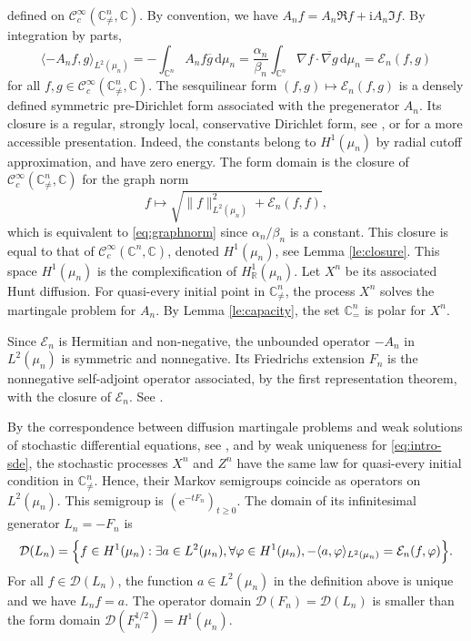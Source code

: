 \documentclass[11pt,reqno]{amsart}
\numberwithin{equation}{section}%
\numberwithin{figure}{section}%
\numberwithin{table}{section}
\theoremstyle{plain}
\theoremstyle{definition}
\begin{document}
defined on $\mathcal{C}^\infty_c(\mathbb{C}^n_{\neq},\mathbb{C})$. By
convention, we have $A_nf=A_n\Re f+\mathrm{i}A_n\Im f$. By integration by
parts,
\begin{equation}
  \langle -A_nf,g\rangle_{L^2(\mu_n)}
  =-\int_{\mathbb{C}^n}A_nf\overline{g}\,\mathrm{d}\mu_n
  =\frac{\alpha_n}{\beta_n}\int_{\mathbb{C}^n}\nabla f\cdot\overline{\nabla g}\,\mathrm{d}\mu_n
  =\mathcal{E}_n(f,g)
\end{equation}
for all $f,g\in\mathcal{C}^\infty_c(\mathbb{C}^n_{\neq},\mathbb{C})$. The
sesquilinear form $(f,g)\mapsto\mathcal{E}_n(f,g)$ is a densely defined
symmetric pre-Dirichlet form associated with the pregenerator $A_n$. Its
closure is a regular, strongly local, conservative Dirichlet form, see
\cite[Ch.~2, 4, 5, and 7]{FukushimaOshimaTakeda}, or \cite{Ouhabaz} for a more
accessible presentation. Indeed, the constants belong to $H^1(\mu_n)$ by
radial cutoff approximation, and have zero energy. The form domain is the
closure of $\mathcal{C}^\infty_c(\mathbb{C}^n_{\neq},\mathbb{C})$ for the
graph norm
\begin{equation}\label{eq:graph:norm:En}
  f\mapsto\sqrt{\|f\|_{L^2(\mu_n)}^2+\mathcal{E}_n(f,f)},
\end{equation}
which is equivalent to \eqref{eq:graphnorm} since $\alpha_n/\beta_n$ is a
constant. This closure is equal to that of
$\mathcal{C}^\infty_c(\mathbb{C}^n,\mathbb{C})$, denoted $H^1(\mu_n)$, see
Lemma \ref{le:closure}. This space $H^1(\mu_n)$ is the complexification of
$H^1_{\mathbb{R}}(\mu_n)$. Let $X^n$ be its associated Hunt diffusion. For
quasi-every initial point in $\mathbb{C}^n_{\neq}$, the process $X^n$ solves
the martingale problem for $A_n$. By Lemma \ref{le:capacity}, the set
$\mathbb{C}^n_{=}$ is polar for $X^n$.

Since $\mathcal{E}_n$ is Hermitian and non-negative, the unbounded operator
$-A_n$ in $L^2(\mu_n)$ is symmetric and nonnegative. Its Friedrichs extension
$F_n$ is the nonnegative self-adjoint operator associated, by the first
representation theorem, with the closure of $\mathcal{E}_n$. See
\cite[Ch.~VI]{Kato}.

By the correspondence between diffusion martingale problems and weak solutions
of stochastic differential equations, see \cite[Chs.~4--5]{EthierKurtz}, and
by weak uniqueness for \eqref{eq:intro-sde}, the stochastic processes $X^n$
and $Z^n$ have the same law for quasi-every initial condition in
$\mathbb{C}^n_{\neq}$. Hence, their Markov semigroups coincide as operators on
$L^2(\mu_n)$. This semigroup is ${(\mathrm{e}^{-tF_n})}_{t\geq0}$. The domain
of its infinitesimal generator $L_n=-F_n$ is
\begin{equation}
  \mathcal{D}(L_n)
  =\Bigl\{f\in H^1(\mu_n):\exists a\in L^2(\mu_n),
  \forall\varphi\in H^1(\mu_n),
  -\langle a,\varphi\rangle_{L^2(\mu_n)}=\mathcal{E}_n(f,\varphi)\Bigr\}.
\end{equation}
For all $f\in\mathcal{D}(L_n)$, the function $a\in L^2(\mu_n)$ in the
definition above is unique and we have $L_nf=a$. The operator domain
$\mathcal{D}(F_n)=\mathcal{D}(L_n)$ is smaller than the form domain
$\mathcal{D}(F_n^{1/2})=H^1(\mu_n)$.
\end{document}
